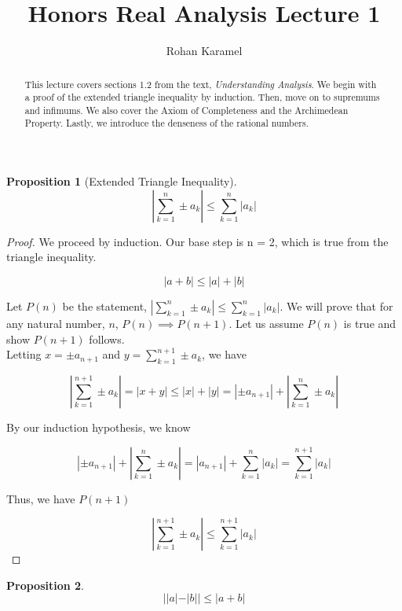 \documentclass[12pt,reqno]{amsart}
\title{Honors Real Analysis Lecture 1}
\author{Rohan Karamel}
\theoremstyle{plain}
\newtheorem*{proposition}{Proposition}
\begin{document}
    \begin{abstract}
        This lecture covers sections 1.2 from the text, \textit{Understanding Analysis}.
        We begin with a proof of the extended triangle inequality by induction. 
        Then, move on to supremums and infimums. 
        We also cover the Axiom of Completeness and the Archimedean Property. 
        Lastly, we introduce the denseness of the rational numbers.
    \end{abstract}

    \maketitle

    \begin{proposition}[Extended Triangle Inequality]
        \[ |\sum_{k=1}^n\pm a_k| \le \sum_{k=1}^n |a_k| \]
    \end{proposition}


    \begin{proof}
        We proceed by induction.
        Our base step is n = 2, which is true from the triangle inequality.

        \[ |a + b| \le |a| + |b| \]

        Let $P(n)$ be the statement, $|\sum_{k=1}^n\pm a_k| \le \sum_{k=1}^n |a_k|$. 
        We will prove that for any natural number, $n$, $P(n) \implies P(n+1)$. 
        Let us assume $P(n)$ is true and show $P(n+1)$ follows. \\
        Letting $x = \pm a_{n+1}$ and $y = \sum_{k=1}^{n+1}\pm a_k$, we have

        \[ |\sum_{k=1}^{n+1}\pm a_k| = |x + y| \le |x| + |y| = |\pm a_{n+1}| + |\sum_{k=1}^{n}\pm a_k| \]

        By our induction hypothesis, we know

        \[ |\pm a_{n+1}| + |\sum_{k=1}^{n}\pm a_k| = |a_{n+1}| + \sum_{k=1}^n|a_k| = \sum_{k=1}^{n+1}|a_k| \]

        Thus, we have $P(n+1)$

        \[ |\sum_{k=1}^{n+1}\pm a_k| \le \sum_{k=1}^{n+1}|a_k|\]

    \end{proof}

    \pagebreak

    \begin{proposition}
        \[ ||a| - |b|| \le |a+b| \]
    \end{proposition}
\end{document}
